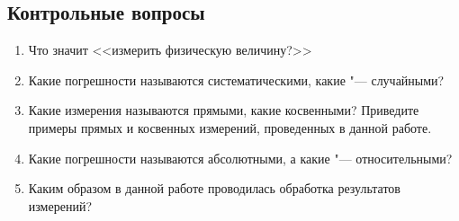 \documentclass[a4paper, 12pt]{extarticle}
\begin{document}
\subsection{Контрольные вопросы}
\begin{enumerate}
\item Что значит <<измерить физическую величину?>> 
\item Какие погрешности называются систематическими, какие "--- случайными? 
\item Какие измерения называются прямыми, какие косвенными? Приведите примеры прямых и косвенных измерений,  проведенных в данной работе. 
\item Какие погрешности называются абсолютными, а какие "--- относительными? 
\item Каким образом в данной работе проводилась обработка результатов измерений?
\end{enumerate}
\end{document}
